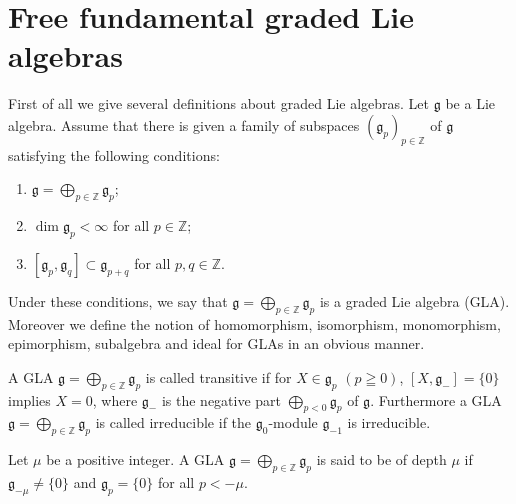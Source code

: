 \documentclass[pdftex]{sigma}
\numberwithin{equation}{section}
\numberwithin{theorem}{section}
\numberwithin{proposition}{section}
\numberwithin{lemma}{section}
\numberwithin{corollary}{section}
\numberwithin{definition}{section}
\numberwithin{example}{section}
\numberwithin{remark}{section}
\numberwithin{note}{section}
\newcommand{\gla}[1]{\mathfrak#1=\bigoplus\limits_{p\in\mathbb Z}\mathfrak#1_p} \renewcommand{\labelenumi}{{\rm (\arabic{enumi})}}
\begin{document}
\section{Free fundamental graded Lie algebras}\label{section2}

First of all we give several def\/initions about graded Lie algebras.
Let $\mathfrak g$ be a Lie algebra. Assume that there is given a family of
subspaces $(\mathfrak g_p)_{p\in\mathbb Z}$ of $\mathfrak g$ satisfying
the following conditions:
\begin{enumerate}\itemsep=0pt
\renewcommand{\labelenumi}{$(\roman{enumi})$}
\item $\gla g$;
\item $\dim \mathfrak g_p<\infty$ for all $p\in\mathbb Z$;
\item $[\mathfrak g_p,\mathfrak g_q]\subset \mathfrak g_{p+q}$
for all $p,q\in\mathbb Z$.
\end{enumerate}
Under these conditions, we say that $\gla g$ is a graded Lie algebra (GLA).
Moreover we def\/ine the notion of homomorphism, isomorphism, monomorphism,
epimorphism, subalgebra and
ideal for GLAs in an obvious manner.

A GLA $\gla g$ is called transitive if
for $X\in\mathfrak g_p$ $(p\geqq0)$, $[X,\mathfrak g_-]=\{0\}$ implies $X=0$,
where $\mathfrak g_-$ is the negative part
$\bigoplus\limits_{p<0}\mathfrak g_p$ of $\mathfrak g$.
Furthermore a GLA $\gla g$ is called irreducible if
the $\mathfrak g_0$-module $\mathfrak g_{-1}$ is irreducible.

Let $\mu$ be a positive integer. A GLA
$\gla g$ is said to be of depth $\mu$ if $\mathfrak g_{-\mu}\ne\{0\}$ and
$\mathfrak g_p=\{0\}$ for all $p<-\mu$.
\end{document}
